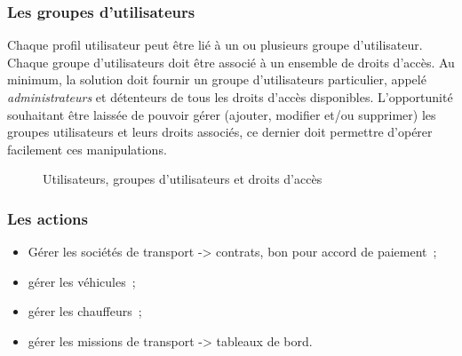 \subsubsection{Les groupes d'utilisateurs}
Chaque profil utilisateur peut être lié à un ou plusieurs groupe d'utilisateur.
Chaque groupe d'utilisateurs doit être associé à un ensemble de droits d'accès.
Au minimum, la solution doit fournir un groupe d'utilisateurs particulier, appelé \emph{administrateurs} et détenteurs de tous les droits d'accès disponibles. L'opportunité souhaitant être laissée de pouvoir gérer (ajouter, modifier et/ou supprimer) les groupes utilisateurs et leurs droits associés, ce dernier doit permettre d'opérer facilement ces manipulations.

\begin{figure}
\caption{Utilisateurs, groupes d'utilisateurs et droits d'accès}
\end{figure}

\subsubsection{Les actions}
\begin{itemize}
\item Gérer les sociétés de transport -> contrats, bon pour accord de paiement~;
\item gérer les véhicules~;
\item gérer les chauffeurs~;
\item gérer les missions de transport -> tableaux de bord.
\end{itemize}

